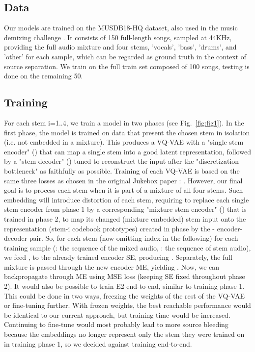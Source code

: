 \documentclass{llncs}
\begin{document}
\subsection{Data}

Our models are trained on the MUSDB18-HQ \cite{MUSDB18HQ} dataset, also used in the music demixing challenge \cite{musicDemixing}. It consists of 150 full-length songs, sampled at 44KHz, providing the full audio mixture and four stems, 'vocals', 'bass', 'drums', and 'other' for each sample, which can be regarded as ground truth in the context of source separation. We train on the full train set composed of 100 songs, testing is done on the remaining 50. 

\subsection{Training}





For each stem i=1..4, we train a model in two phases (see Fig.~\ref{fig:fig1}). In
the first phase, the model is trained on data that present the chosen
stem in isolation (i.e. not embedded in a mixture). This produces a
VQ-VAE with a "single stem encoder" () that can map a single
stem into a good latent representation, followed by a "stem decoder"
()  tuned  to  reconstruct  the  input  after  the  "discretization
bottleneck" as faithfully as possible. Training of each VQ-VAE is based
on the same three losses as chosen in the original Jukebox paper
\cite{dhariwal2020jukebox} : . However, our
final goal is to process each stem when it is part of a mixture of all
four stems. Such embedding will introduce distortion of each stem,
requiring to replace each single stem encoder  from phase 1 by a
corresponding "mixture stem encoder" () that is trained in phase
2, to map its changed (mixture embedded) stem  input onto the representation (stem-i codebook prototypes) created
in phase by the - encoder-decoder pair. So, for each stem 
(now omitting index  in the following) for each training sample (:
the sequence of the mixed audio,  : the sequence of stem audio),
we feed  , to  the  already  trained  encoder SE,  producing  .
Separately, the full mixture  is passed through the new encoder
ME, yielding . Now, we can backpropagate through ME using MSE
loss  (keeping SE fixed throughout phase 2). 
It would also be possible to train E2 end-to-end, similar to training phase 1. This could be done in two ways, freezing the weights of the rest of the VQ-VAE or fine-tuning further. With frozen weights, the best reachable performance would be identical to our current approach, but training time
would be increased. Continuing to fine-tune would most probably lead to more source bleeding because the embeddings no longer represent only the stem they were trained on in training phase 1, so we decided against training end-to-end.
\end{document}
